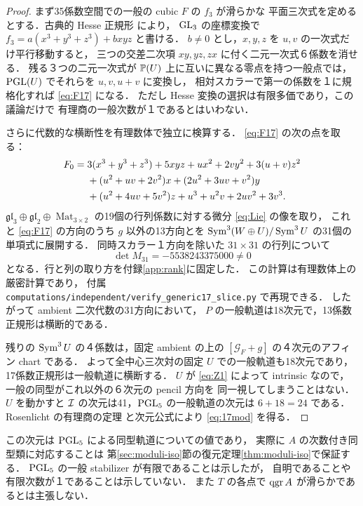 \begin{proof}
まず35係数空間での一般の cubic $F$ の $f_3$ が滑らかな
平面三次式を定めるとする．古典的 Hesse 正規形
\cite[\S2, Lemma~2.1]{AD} により，
$\mathrm{GL}_3$ の座標変換で $f_3=a(x^3+y^3+z^3)+bxyz$ と書ける．
$b\ne0$ とし，$x,y,z$ を $u,v$ の一次式だけ平行移動すると，
三つの交差二次項 $xy,yz,zx$ に付く二元一次式６係数を消せる．
残る３つの二元一次式が $\mathbb P(U)$ 上に互いに異なる零点を持つ一般点では，
$\mathrm{PGL}(U)$ でそれらを $u,v,u+v$ に変換し，
相対スカラーで第一の係数を１に規格化すれば \eqref{eq:F17} になる．
ただし Hesse 変換の選択は有限多価であり，この議論だけで
有理商の一般次数が１であるとはいわない．

さらに代数的な横断性を有理数体で独立に検算する．
\eqref{eq:F17} の次の点を取る：
\begin{align}\label{eq:F0}
 F_0={}&3(x^3+y^3+z^3)+5xyz+ux^2+2vy^2+3(u+v)z^2\notag\\
 &+(u^2+uv+2v^2)x+(2u^2+3uv+v^2)y\\
 &+(u^2+4uv+5v^2)z+u^3+u^2v+2uv^2+3v^3.\notag
\end{align}
$\mathfrak{gl}_3\oplus\mathfrak{gl}_2\oplus\operatorname{Mat}_{3\times2}$
の19個の行列係数に対する微分 \eqref{eq:Lie} の像を取り，
これと \eqref{eq:F17} の方向のうち $g$ 以外の13方向とを
$\operatorname{Sym}^3(W\oplus U)/\operatorname{Sym}^3U$ の31個の単項式に展開する．
同時スカラー１方向を除いた $31\times31$ の行列について
\begin{equation}\label{eq:det}
 \boxed{\det M_{31}=-5538243375000\ne0}
\end{equation}
となる．行と列の取り方を付録\ref{app:rank}に固定した．
この計算は有理数体上の厳密計算であり，
付属 \nolinkurl{computations/independent/verify_generic17_slice.py} で再現できる．
したがって ambient 二次代数の31方向において，
$P$ の一般軌道は18次元で，13係数正規形は横断的である．

残りの $\operatorname{Sym}^3U$ の４係数は，固定 ambient の上の
$[\mathcal G_F+g]$ の４次元のアフィン chart である．
よって全中心三次対の固定 $U$ での一般軌道も18次元であり，
17係数正規形は一般軌道に横断する．
$U$ が \eqref{eq:Z1} によって intrinsic なので，
一般の同型がこれ以外の６次元の pencil 方向を
同一視してしまうことはない．
$U$ を動かすと $\mathcal I$ の次元は41，$\mathrm{PGL}_5$ の一般軌道の次元は
$6+18=24$ である．Rosenlicht の有理商の定理 \cite{Rosenlicht}
と次元公式により \eqref{eq:17mod} を得る．
\end{proof}

\begin{remark}\label{rem:meaning}
この次元は $\mathrm{PGL}_5$ による同型軌道についての値であり，
実際に $A$ の次数付き同型類に対応することは
第\ref{sec:moduli-iso}節の復元定理\ref{thm:moduli-iso}で保証する．
$\mathrm{PGL}_5$ の一般 stabilizer が有限であることは示したが，
自明であることや有限次数が１であることは示していない．
また $T$ の各点で $\operatorname{qgr} A$ が滑らかであるとは主張しない．
\end{remark}

